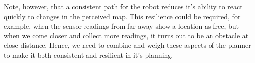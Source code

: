 \documentclass[letterpaper]{article} %
\begin{document}

Note, however, that a consistent path for the robot reduces it’s ability to react quickly to changes in the perceived map. This resilience could be required, for example, when the sensor readings from far away show a location as free, but when we come closer and collect more readings, it turns out to be an obstacle at close distance. Hence, we need to combine and weigh these aspects of the planner to make it both consistent and resilient in it’s planning.
\end{document}
